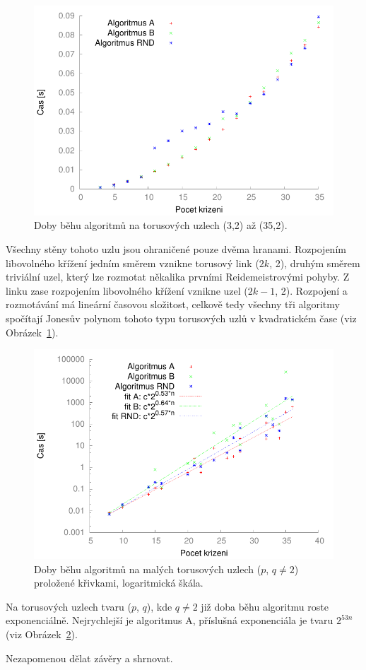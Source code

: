 \begin{figure}[p]\centering
\includegraphics{../img/torus2}
\caption{Doby běhu algoritmů na torusových uzlech (3,2) až (35,2).}
\label{obr03:torus2}
\end{figure}

Všechny stěny tohoto uzlu jsou ohraničené pouze dvěma hranami. Rozpojením libovolného křížení jedním směrem vznikne torusový link ($2k$, 2), druhým směrem triviální uzel, který lze rozmotat někalika prvními Reidemeistrovými pohyby. Z linku zase rozpojením libovolného křížení vznikne uzel ($2k-1$, 2). Rozpojení a rozmotávání má lineární časovou složitost, celkově tedy všechny tři algoritmy spočítají Jonesův polynom tohoto typu torusových uzlů v kvadratickém čase (viz Obrázek~\ref{obr03:torus2}).

\begin{figure}[p]\centering
\includegraphics{../img/torusNe2FIT}
\caption{Doby běhu algoritmů na malých torusových uzlech ($p$, $q\neq 2$) proložené křivkami, logaritmická škála.}
\label{obr03:torusFIT}
\end{figure}

Na torusových uzlech tvaru ($p$, $q$), kde $q\neq 2$ již doba běhu algoritmu roste exponenciálně. Nejrychlejší je algoritmus A, příslušná  exponenciála je tvaru $2^{53n}$ (viz Obrázek~\ref{obr03:torusFIT}).

Nezapomenou dělat závěry a shrnovat.

